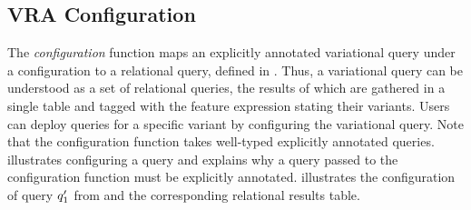 \subsection{VRA Configuration}
\label{sec:vraconf}

%

%
The \emph{configuration} function maps an explicitly annotated variational query under
a configuration
to a relational query, defined in . Thus, a variational query 
can be understood as a set of relational queries, the results of which are gathered
in a single table and tagged with the feature expression stating their variants.
%
Users can deploy queries for a specific variant by configuring 
the variational query.
%
Note that the configuration function takes well-typed explicitly annotated queries.
 illustrates configuring a query and explains 
why a query passed to the configuration function must be explicitly annotated.
 illustrates the configuration of query $\VVal {\vQ_1}$ from  and the corresponding relational results table.
%

